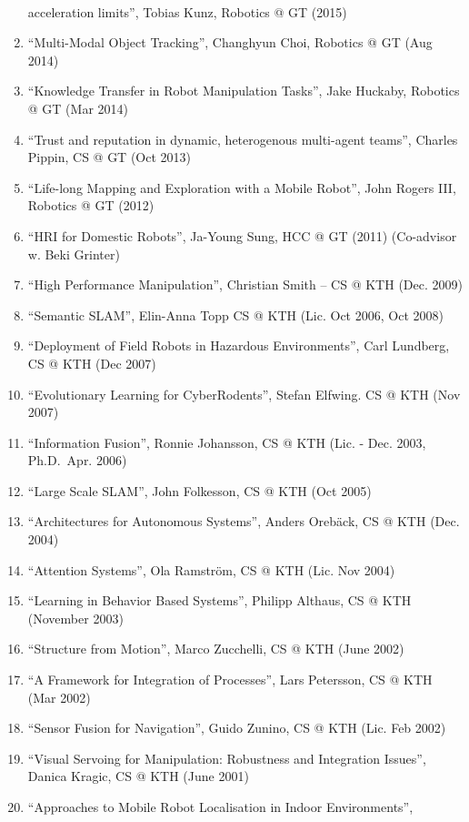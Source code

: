 \documentclass{article}
\begin{document}
\begin{cv}
\begin{cvlist}{~}
\begin{enumerate}
          acceleration limits'', Tobias Kunz, Robotics @ GT (2015)
    \item ``Multi-Modal Object Tracking'', Changhyun Choi, Robotics @ GT (Aug
          2014)
    \item ``Knowledge Transfer in Robot Manipulation Tasks'', Jake Huckaby,
          Robotics @ GT (Mar 2014)
    \item ``Trust and reputation in dynamic, heterogenous multi-agent teams'',
          Charles Pippin, CS @ GT (Oct 2013)
    \item ``Life-long Mapping and Exploration with a Mobile Robot'', John Rogers
          III, Robotics @ GT (2012)
    \item ``HRI for Domestic Robots'', Ja-Young Sung, HCC @ GT (2011)
          (Co-advisor w. Beki Grinter)
    \item ``High Performance Manipulation'', Christian Smith -- CS @ KTH (Dec.
          2009)
    \item ``Semantic SLAM'', Elin-Anna Topp CS @ KTH (Lic. Oct 2006, Oct 2008)
    \item ``Deployment of Field Robots in Hazardous Environments'', Carl
          Lundberg, CS @ KTH (Dec 2007)
    \item ``Evolutionary Learning for CyberRodents'', Stefan Elfwing. CS @ KTH
          (Nov 2007)
    \item ``Information Fusion'', Ronnie Johansson, CS @ KTH (Lic. - Dec. 2003,
          Ph.D.\ Apr. 2006)
    \item ``Large Scale SLAM'', John Folkesson, CS @ KTH (Oct 2005)
    \item ``Architectures for Autonomous Systems'', Anders Oreb{\"a}ck, CS @ KTH
          (Dec. 2004)
    \item ``Attention Systems'', Ola Ramstr\"om, CS @ KTH (Lic. Nov 2004)
    \item ``Learning in Behavior Based Systems'', Philipp Althaus, CS @ KTH
          (November 2003)
    \item ``Structure from Motion'', Marco Zucchelli, CS @ KTH (June 2002)
    \item ``A Framework for Integration of Processes'', Lars Petersson, CS @ KTH
          (Mar 2002)
    \item ``Sensor Fusion for Navigation'', Guido Zunino, CS @ KTH (Lic. Feb
          2002)
    \item ``Visual Servoing for Manipulation: Robustness and Integration
          Issues'', Danica Kragic, CS @ KTH (June 2001)
    \item ``Approaches to Mobile Robot Localisation in Indoor Environments'',

\end{enumerate}
\end{cvlist}
\end{cv}
\end{document}
